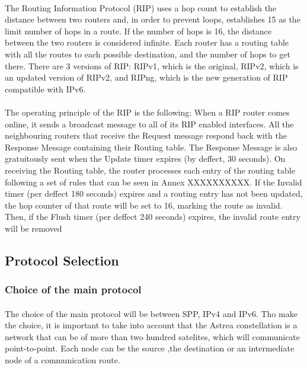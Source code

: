 \begin{itemize}
\paragraph{}The Routing Information Protocol (RIP) uses a hop count to establish the distance between two routers and, in order to prevent loops, establishes 15 as the limit number of hops in a route. If the number of hops is 16, the distance between the two routers is considered infinite. Each router has a routing table with all the routes to each possible destination, and the number of hops to get there. There are 3 versions of RIP: RIPv1, which is the original, RIPv2, which is an updated version of RIPv2, and RIPng, which is the new generation of RIP compatible with IPv6.
\paragraph{}The operating principle of the RIP is the following: When a RIP router comes online, it sends a broadcast message to all of its RIP enabled interfaces. All the neighbouring routers that receive the Request message respond back with the Response Message containing their Routing table. The Response Message is also gratuitously sent when the Update timer expires (by deffect, 30 seconds). On receiving the Routing table, the router processes each entry of the routing table following a set of rules that can be seen in Annex XXXXXXXXXX. If the Invalid timer (per deffect 180 seconds) expires and a routing entry has not been updated, the hop counter of that route will be set to 16, marking the route as invalid. Then, if the Flush timer (per deffect 240 seconds) expires, the invalid route entry will be removed

\subsection{Protocol Selection}

\subsubsection{Choice of the main protocol}
\paragraph{}The choice of the main protocol will be between SPP, IPv4 and IPv6. Tho make the choice, it is important to take into account that the Astrea constellation is a network that can be of more than two hundred satelites, which will communicate point-to-point. Each node can be the source ,the destination or an intermediate node of a communication route.

\end{itemize}
